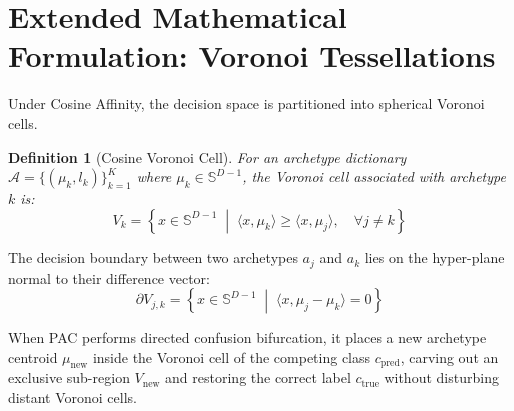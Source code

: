 \documentclass[11pt,a4paper]{article}
\newtheorem{definition}{Definition}
\begin{document}
\section{Extended Mathematical Formulation: Voronoi Tessellations}
\label{sec:appendix_voronoi}

Under Cosine Affinity, the decision space is partitioned into spherical Voronoi cells.

\begin{definition}[Cosine Voronoi Cell]
For an archetype dictionary $\mathcal{A} = \{(\mu_k, l_k)\}_{k=1}^K$ where $\mu_k \in \mathbb{S}^{D-1}$, the Voronoi cell associated with archetype $k$ is:
\begin{equation}
    V_k = \left\{ x \in \mathbb{S}^{D-1} \;\middle|\; \langle x, \mu_k \rangle \ge \langle x, \mu_j \rangle, \quad \forall j \neq k \right\}
\end{equation}
\end{definition}

The decision boundary between two archetypes $a_j$ and $a_k$ lies on the hyper-plane normal to their difference vector:
\begin{equation}
    \partial V_{j, k} = \left\{ x \in \mathbb{S}^{D-1} \;\middle|\; \langle x, \mu_j - \mu_k \rangle = 0 \right\}
\end{equation}

When PAC performs directed confusion bifurcation, it places a new archetype centroid $\mu_{\text{new}}$ inside the Voronoi cell of the competing class $c_{\text{pred}}$, carving out an exclusive sub-region $V_{\text{new}}$ and restoring the correct label $c_{\text{true}}$ without disturbing distant Voronoi cells.
\end{document}
